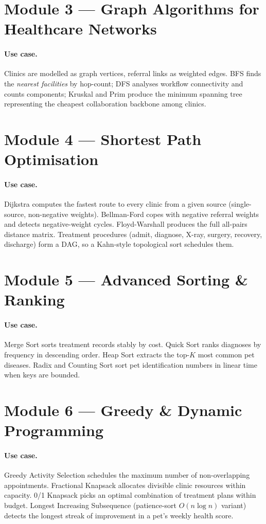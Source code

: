 \documentclass[11pt,a4paper]{article}
\begin{document}
\section{Module 3 --- Graph Algorithms for Healthcare Networks}
\paragraph{Use case.} Clinics are modelled as graph vertices, referral
links as weighted edges. BFS finds the \emph{nearest facilities} by
hop-count; DFS analyses workflow connectivity and counts components;
Kruskal and Prim produce the minimum spanning tree representing the
cheapest collaboration backbone among clinics.

\section{Module 4 --- Shortest Path Optimisation}
\paragraph{Use case.} Dijkstra computes the fastest route to every clinic
from a given source (single-source, non-negative weights). Bellman-Ford
copes with negative referral weights and detects negative-weight cycles.
Floyd-Warshall produces the full all-pairs distance matrix. Treatment
procedures (admit, diagnose, X-ray, surgery, recovery, discharge) form a
DAG, so a Kahn-style topological sort schedules them.

\section{Module 5 --- Advanced Sorting \& Ranking}
\paragraph{Use case.} Merge Sort sorts treatment records stably by cost.
Quick Sort ranks diagnoses by frequency in descending order. Heap Sort
extracts the top-\(K\) most common pet diseases. Radix and Counting Sort
sort pet identification numbers in linear time when keys are bounded.

\section{Module 6 --- Greedy \& Dynamic Programming}
\paragraph{Use case.} Greedy Activity Selection schedules the maximum
number of non-overlapping appointments. Fractional Knapsack allocates
divisible clinic resources within capacity. 0/1 Knapsack picks an optimal
combination of treatment plans within budget. Longest Increasing
Subsequence (patience-sort \(O(n \log n)\) variant) detects the longest
streak of improvement in a pet's weekly health score.
\end{document}
